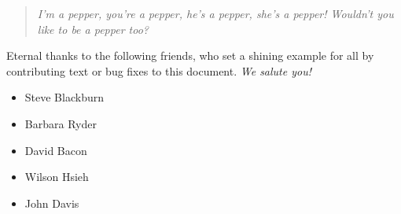 \begin{quote}
{\em I'm a pepper, you're a pepper, he's a pepper, she's a pepper! Wouldn't you
like to be a pepper too?} \\
\author{--- Ancient proverb}
\end{quote}


Eternal thanks to the following friends,
who set a shining example for
all by contributing text or bug fixes to this document.  
{\em We salute you!}

\begin{itemize}
\item Steve Blackburn
\item Barbara Ryder
\item David Bacon
\item Wilson Hsieh
\item John Davis
\end{itemize}
